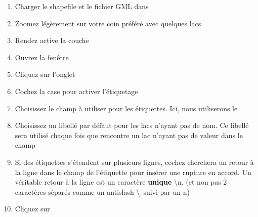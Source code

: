 \begin{enumerate}
\item Charger le shapefile  et le fichier GML  dans \qg
\item Zoomez légèrement sur votre coin préféré avec quelques lacs
\item Rendez active la couche 
\item Ouvrez la fenêtre 
\item Cliquez sur l'onglet 
\item Cochez la case  pour activer l'étiquetage
\item Choisissez le champ à utiliser pour les étiquettes. Ici, nous utiliserons le\\ 
\item Choisissez un libellé par défaut pour les lacs n'ayant pas de nom. Ce libellé sera utilisé chaque fois que \qg rencontre un lac n'ayant pas de valeur dans le champ 
\item Si des étiquettes s'étendent sur plusieurs lignes, cochez  \qg cherchera un retour à la ligne dans le champ de l'étiquette pour insérer une rupture en accord. Un véritable retour à la ligne est un caractère \textbf{unique} \textbackslash n, (et non pas 2 caractères séparés comme un antislash \textbackslash ~suivi par un n)
\item Cliquez sur 
\end{enumerate}

